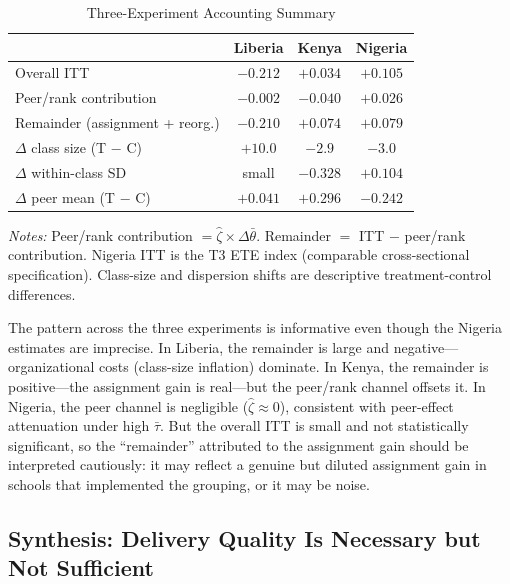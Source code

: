 \documentclass[11pt]{article}
\begin{document}
\begin{table}[H]
\centering
\caption{Three-Experiment Accounting Summary}
\label{tab:accounting_summary}
\begin{threeparttable}
\begin{tabular}[t]{lccc}
\toprule
 & Liberia & Kenya & Nigeria \\
\midrule
Overall ITT & $-0.212$ & $+0.034$ & $+0.105$ \\
Peer/rank contribution & $-0.002$ & $-0.040$ & $+0.026$ \\
Remainder (assignment + reorg.) & $-0.210$ & $+0.074$ & $+0.079$ \\
\addlinespace
$\Delta$ class size (T $-$ C) & $+10.0$ & $-2.9$ & $-3.0$ \\
$\Delta$ within-class SD & small & $-0.328$ & $+0.104$ \\
$\Delta$ peer mean (T $-$ C) & $+0.041$ & $+0.296$ & $-0.242$ \\
\bottomrule
\end{tabular}
\begin{tablenotes}
\footnotesize
\item \textit{Notes:} Peer/rank contribution $= \hat{\zeta} \times \Delta\bar{\theta}$. Remainder $=$ ITT $-$ peer/rank contribution. Nigeria ITT is the T3 ETE index (comparable cross-sectional specification). Class-size and dispersion shifts are descriptive treatment-control differences.
\end{tablenotes}
\end{threeparttable}
\end{table}

The pattern across the three experiments is informative even though the Nigeria estimates are imprecise. In Liberia, the remainder is large and negative---organizational costs (class-size inflation) dominate. In Kenya, the remainder is positive---the assignment gain is real---but the peer/rank channel offsets it. In Nigeria, the peer channel is negligible ($\hat{\zeta} \approx 0$), consistent with peer-effect attenuation under high $\bar{\tau}$. But the overall ITT is small and not statistically significant, so the ``remainder'' attributed to the assignment gain should be interpreted cautiously: it may reflect a genuine but diluted assignment gain in schools that implemented the grouping, or it may be noise.

\subsection{Synthesis: Delivery Quality Is Necessary but Not Sufficient}
\end{document}
